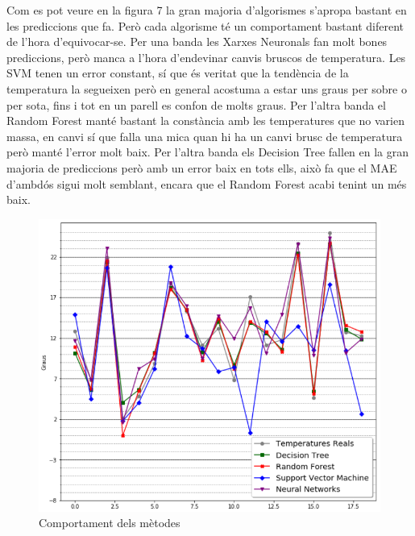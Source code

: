 \documentclass[10pt,a4paper,twocolumn,twoside]{article}
\begin{document}
Com es pot veure en la figura 7 la gran majoria d'algorismes s'apropa bastant en les prediccions que fa. Però cada algorisme té un comportament bastant diferent de l'hora d'equivocar-se. Per una banda les Xarxes Neuronals fan molt bones prediccions, però manca a l'hora d'endevinar canvis bruscos de temperatura. Les SVM tenen un error constant, sí que és veritat que la tendència de la temperatura la segueixen però en general acostuma a estar uns graus per sobre o per sota, fins i tot en un parell es confon de molts graus.
Per l'altra banda el Random Forest manté bastant la constància amb les temperatures que no varien massa, en canvi sí que falla una mica quan hi ha un canvi brusc de temperatura però manté l'error molt baix. Per l'altra banda els Decision Tree fallen en la gran majoria de prediccions però amb un error baix en tots ells, això fa que el MAE d'ambdós sigui molt semblant, encara que el Random Forest acabi tenint un més baix.

\begin{figure}[!h]
\centering
	\includegraphics[scale=0.4,center]{../img/comparacioAlgs}
	\caption{Comportament dels mètodes}
	\label{fig-temps}
\end{figure}
\end{document}
